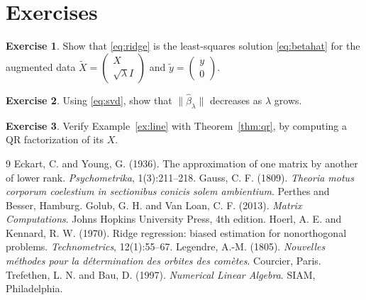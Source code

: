 \documentclass[11pt,oneside,openany]{book}
\theoremstyle{definition}
\newtheorem{exercise}{Exercise}[chapter]
\numberwithin{equation}{chapter}
\begin{document}
\section*{Exercises}
\begin{exercise}\label{exr:augment}
Show that \eqref{eq:ridge} is the least-squares solution \eqref{eq:betahat} for the augmented data
$\tilde X = \begin{pmatrix} X \\ \sqrt{\lambda} I \end{pmatrix}$ and $\tilde y = \begin{pmatrix} y \\ 0 \end{pmatrix}$.
\end{exercise}
\begin{exercise}\label{exr:norm}
Using \eqref{eq:svd}, show that $\|\hat\beta_\lambda\|$ decreases as $\lambda$ grows.
\end{exercise}
\begin{exercise}\label{exr:qrcheck}
Verify Example~\ref{ex:line} with Theorem~\ref{thm:qr}, by computing a QR factorization of its $X$.
\end{exercise}

\begin{thebibliography}{9}
 Eckart, C. and Young, G. (1936). The approximation of one matrix by another of lower rank. \emph{Psychometrika}, 1(3):211--218.
 Gauss, C. F. (1809). \emph{Theoria motus corporum coelestium in sectionibus conicis solem ambientium}. Perthes and Besser, Hamburg.
 Golub, G. H. and Van Loan, C. F. (2013). \emph{Matrix Computations}. Johns Hopkins University Press, 4th edition.
 Hoerl, A. E. and Kennard, R. W. (1970). Ridge regression: biased estimation for nonorthogonal problems. \emph{Technometrics}, 12(1):55--67.
 Legendre, A.-M. (1805). \emph{Nouvelles m\'ethodes pour la d\'etermination des orbites des com\`etes}. Courcier, Paris.
 Trefethen, L. N. and Bau, D. (1997). \emph{Numerical Linear Algebra}. SIAM, Philadelphia.
\end{thebibliography}

\printindex
\end{document}
